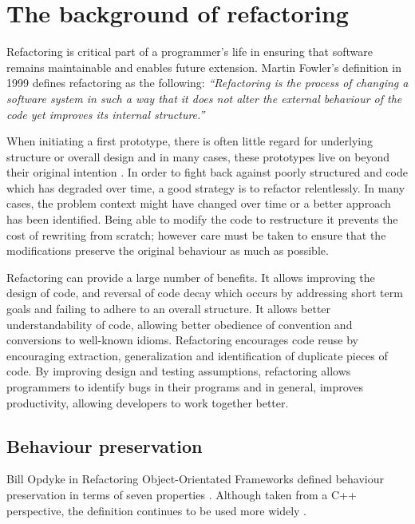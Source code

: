 \section{The background of refactoring}\label{S:refactorback}
Refactoring is critical part of a programmer's life in ensuring that software remains maintainable and enables future extension. Martin Fowler's definition in 1999 \cite{fowler99} defines refactoring as the following: \emph{``Refactoring is the process of changing a software system in such a way that it does not alter the external behaviour of the code yet improves its internal structure.''}

When initiating a first prototype, there is often little regard for underlying structure or overall design and in many cases, these prototypes live on beyond their original intention \cite{foote1997big}. In order to fight back against poorly structured and code which has degraded over time, a good strategy is to refactor relentlessly. In many cases, the problem context might have changed over time or a better approach has been identified. Being able to modify the code to restructure it prevents the cost of rewriting from scratch; however care must be taken to ensure that the modifications preserve the original behaviour as much as possible.

Refactoring can provide a large number of benefits. It allows improving the design of code, and reversal of code decay which occurs by addressing short term goals and failing to adhere to an overall structure. It allows better understandability of code, allowing better obedience of convention and conversions to well-known idioms. Refactoring encourages code reuse by encouraging extraction, generalization and identification of duplicate pieces of code. By improving design and testing assumptions, refactoring allows programmers to identify bugs in their programs and in general, improves productivity, allowing developers to work together better.

\subsection{Behaviour preservation}
Bill Opdyke in Refactoring Object-Orientated Frameworks defined behaviour preservation in terms of seven properties \cite{opdyke1992refactoring}. Although taken from a C++ perspective, the definition continues to be used more widely \cite{schafer2010specification}.


